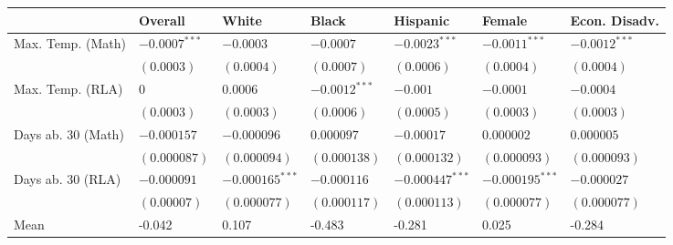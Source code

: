 
\begin{tabular}{lllllll}
\toprule
  & Overall & White & Black & Hispanic & Female & Econ. Disadv.\\
\midrule
Max. Temp. (Math) & $-0.0007^{***}$ & $-0.0003$ & $-0.0007$ & $-0.0023^{***}$ & $-0.0011^{***}$ & $-0.0012^{***}$\\
 & $(0.0003)$ & $(0.0004)$ & $(0.0007)$ & $(0.0006)$ & $(0.0004)$ & $(0.0004)$\\
\addlinespace
Max. Temp. (RLA) & $0$ & $0.0006$ & $-0.0012^{***}$ & $-0.001$ & $-0.0001$ & $-0.0004$\\
 & $(0.0003)$ & $(0.0003)$ & $(0.0006)$ & $(0.0005)$ & $(0.0003)$ & $(0.0003)$\\
\addlinespace
Days ab. 30 (Math) & $-0.000157$ & $-0.000096$ & $0.000097$ & $-0.00017$ & $0.000002$ & $0.000005$\\
 & $(0.000087)$ & $(0.000094)$ & $(0.000138)$ & $(0.000132)$ & $(0.000093)$ & $(0.000093)$\\
\addlinespace
Days ab. 30 (RLA) & $-0.000091$ & $-0.000165^{***}$ & $-0.000116$ & $-0.000447^{***}$ & $-0.000195^{***}$ & $-0.000027$\\
 & $(0.00007)$ & $(0.000077)$ & $(0.000117)$ & $(0.000113)$ & $(0.000077)$ & $(0.000077)$\\
\addlinespace
Mean & -0.042 & 0.107 & -0.483 & -0.281 & 0.025 & -0.284\\
\bottomrule
\end{tabular}
